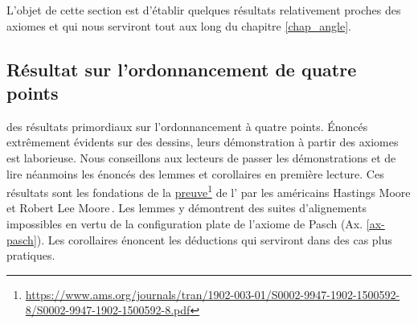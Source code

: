     L'objet de cette section est d'établir quelques résultats relativement proches des axiomes et qui nous serviront tout aux long du chapitre \ref{chap_angle}.



        \subsection{Résultat sur l'ordonnancement de quatre points}\label{subsec-quatrepoints}


 des résultats primordiaux sur l'ordonnancement à quatre points. Énoncés extrêmement évidents sur des dessins, leurs démonstration à partir des axiomes est laborieuse. Nous conseillons aux lecteurs de passer les démonstrations et de lire néanmoins les énoncés des lemmes et corollaires en première lecture.  Ces résultats sont les fondations de la \href{https://www.ams.org/journals/tran/1902-003-01/S0002-9947-1902-1500592-8/S0002-9947-1902-1500592-8.pdf}{preuve}\footnote{\url{https://www.ams.org/journals/tran/1902-003-01/S0002-9947-1902-1500592-8/S0002-9947-1902-1500592-8.pdf}} de l' par les américains Hastings Moore et Robert Lee Moore\,\cite{moore1902projective}. Les lemmes y démontrent des suites d'alignements impossibles en vertu de la configuration plate de l'axiome de Pasch (Ax. \ref{ax-pasch}). Les corollaires énoncent les déductions qui serviront dans des cas plus pratiques.


